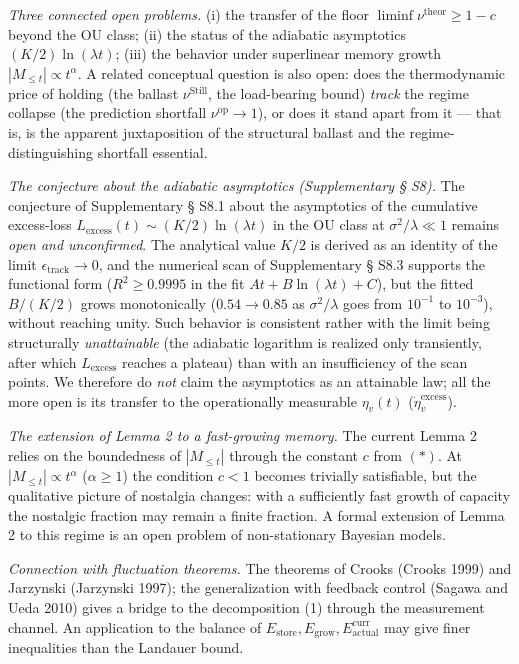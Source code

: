 \documentclass[pdflatex,sn-mathphys-ay]{sn-jnl}
\providecommand{\lt}{<}\providecommand{\gt}{>}
\begin{document}
\emph{Three connected open problems.} (i) the transfer of the floor \(\liminf\nu^{\text{theor}} \ge 1-c\) beyond the OU class; (ii) the status of the adiabatic asymptotics \((K/2)\ln(\lambda t)\); (iii) the behavior under superlinear memory growth \(|M_{\le t}| \propto t^\alpha\). A related conceptual question is also open: does the thermodynamic price of holding (the ballast \(\nu^{\text{Still}}\), the load-bearing bound) \emph{track} the regime collapse (the prediction shortfall \(\nu^{\text{op}} \to 1\)), or does it stand apart from it --- that is, is the apparent juxtaposition of the structural ballast and the regime-distinguishing shortfall essential.



\emph{The conjecture about the adiabatic asymptotics (Supplementary § S8).} The conjecture of Supplementary § S8.1 about the asymptotics of the cumulative excess-loss \(L_{\text{excess}}(t) \sim (K/2)\ln(\lambda t)\) in the OU class at \(\sigma^2/\lambda \ll 1\) remains \emph{open and unconfirmed}. The analytical value \(K/2\) is derived as an identity of the limit \(\epsilon_{\text{track}} \to 0\), and the numerical scan of Supplementary § S8.3 supports the functional form (\(R^2 \ge 0.9995\) in the fit \(A t + B\ln(\lambda t) + C\)), but the fitted \(B/(K/2)\) grows monotonically (\(0.54 \to 0.85\) as \(\sigma^2/\lambda\) goes from \(10^{-1}\) to \(10^{-3}\)), without reaching unity. Such behavior is consistent rather with the limit being structurally \emph{unattainable} (the adiabatic logarithm is realized only transiently, after which \(L_{\text{excess}}\) reaches a plateau) than with an insufficiency of the scan points. We therefore do \emph{not} claim the asymptotics as an attainable law; all the more open is its transfer to the operationally measurable \(\eta_v(t)\) (\(\dot\eta_v^{\text{excess}}\)).



\emph{The extension of Lemma 2 to a fast-growing memory.} The current Lemma 2 relies on the boundedness of \(|M_{\le t}|\) through the constant \(c\) from \((*)\). At \(|M_{\le t}| \propto t^\alpha\) (\(\alpha \ge 1\)) the condition \(c \lt 1\) becomes trivially satisfiable, but the qualitative picture of nostalgia changes: with a sufficiently fast growth of capacity the nostalgic fraction may remain a finite fraction. A formal extension of Lemma 2 to this regime is an open problem of non-stationary Bayesian models.



\emph{Connection with fluctuation theorems.} The theorems of Crooks (Crooks 1999) and Jarzynski (Jarzynski 1997); the generalization with feedback control (Sagawa and Ueda 2010) gives a bridge to the decomposition (1) through the measurement channel. An application to the balance of \(E_{\text{store}}, E_{\text{grow}}, E_{\text{actual}}^{\text{curr}}\) may give finer inequalities than the Landauer bound.
\end{document}
